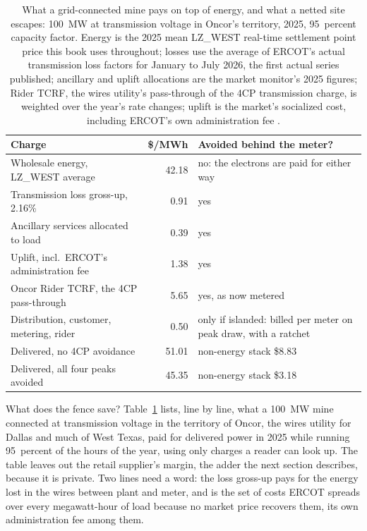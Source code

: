 \begin{table}[htbp]
  \centering
  \footnotesize
  \setlength{\tabcolsep}{4pt}
  \begin{tabular}{>{\raggedright\arraybackslash}p{5.3cm}r>{\raggedright\arraybackslash}p{3.0cm}}
    \hline
    \textbf{Charge} & \textbf{\$/MWh} & \textbf{Avoided behind the meter?} \\
    \hline
    Wholesale energy, LZ\_WEST average & 42.18 & no: the electrons are paid for either way \\
    Transmission loss gross-up, 2.16\% & 0.91 & yes \\
    Ancillary services allocated to load & 0.39 & yes \\
    Uplift, incl.\ ERCOT's administration fee & 1.38 & yes \\
    Oncor Rider TCRF, the 4CP pass-through & 5.65 & yes, as now metered \\
    Distribution, customer, metering, rider & 0.50 & only if islanded: billed per meter on peak draw, with a ratchet \\
    \hline
    Delivered, no 4CP avoidance & 51.01 & non-energy stack \$8.83 \\
    Delivered, all four peaks avoided & 45.35 & non-energy stack \$3.18 \\
    \hline
  \end{tabular}
  \caption{What a grid-connected mine pays on top of energy, and what a netted site escapes: 100~MW at transmission voltage in Oncor's territory, 2025, 95~percent capacity factor. Energy is the 2025 mean LZ\_WEST real-time settlement point price this book uses throughout; losses use the average of ERCOT's actual transmission loss factors for January to July 2026, the first actual series published; ancillary and uplift allocations are the market monitor's 2025 figures; Rider TCRF, the wires utility's pass-through of the 4CP transmission charge, is weighted over the year's rate changes; uplift is the market's socialized cost, including ERCOT's own administration fee \autocite{ercot2026rtm,potomac2026somercot,oncor2026retailtariff,ercotactualtlf}.} %
  \label{tab:btm-ledger}
\end{table}

What does the fence save? Table~\ref{tab:btm-ledger} lists, line by line, what a 100~MW mine connected at transmission voltage in the territory of Oncor, the wires utility for Dallas and much of West Texas, paid for delivered power in 2025 while running 95~percent of the hours of the year, using only charges a reader can look up. %
The table leaves out the retail supplier's margin, the adder the next section describes, because it is private. Two lines need a word: the loss gross-up pays for the energy lost in the wires between plant and meter, and  is the set of costs ERCOT spreads over every megawatt-hour of load because no market price recovers them, its own administration fee among them. %

